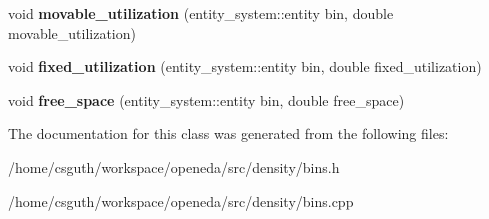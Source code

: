 \begin{DoxyCompactItemize}
\item 
\hypertarget{classophidian_1_1density_1_1bins_ac3b46eb2b00280e09a28faa9623115d6}{void {\bfseries movable\-\_\-utilization} (entity\-\_\-system\-::entity bin, double movable\-\_\-utilization)}\label{classophidian_1_1density_1_1bins_ac3b46eb2b00280e09a28faa9623115d6}

\item 
\hypertarget{classophidian_1_1density_1_1bins_aa27decaec1284af3870d5f1c71264386}{void {\bfseries fixed\-\_\-utilization} (entity\-\_\-system\-::entity bin, double fixed\-\_\-utilization)}\label{classophidian_1_1density_1_1bins_aa27decaec1284af3870d5f1c71264386}

\item 
\hypertarget{classophidian_1_1density_1_1bins_aad5f84feec4cdee54d8a49c0e9b85a2f}{void {\bfseries free\-\_\-space} (entity\-\_\-system\-::entity bin, double free\-\_\-space)}\label{classophidian_1_1density_1_1bins_aad5f84feec4cdee54d8a49c0e9b85a2f}

\end{DoxyCompactItemize}


The documentation for this class was generated from the following files\-:\begin{DoxyCompactItemize}
\item 
/home/csguth/workspace/openeda/src/density/bins.\-h\item 
/home/csguth/workspace/openeda/src/density/bins.\-cpp\end{DoxyCompactItemize}
